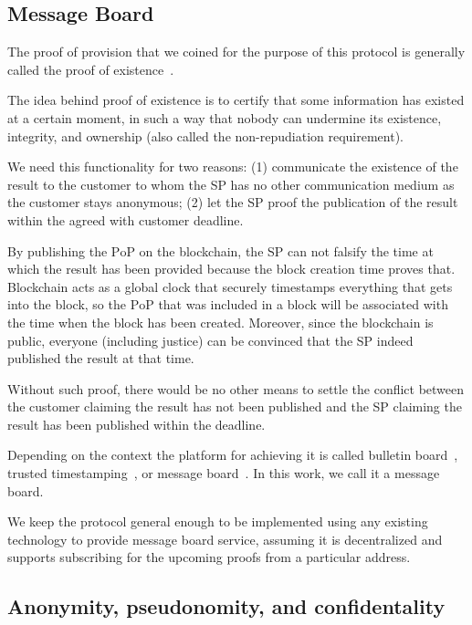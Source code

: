 \subsection{Message Board}\label{sec:message-board}
The proof of provision that we coined for the purpose of this protocol is generally called the proof of existence~\cite{crespoStamperyBlockchainTimestamping2017}.

The idea behind proof of existence is to certify that some information
has existed at a certain moment, in such a way that nobody can
undermine its existence, integrity, and ownership (also called the
non-repudiation requirement).


We need this functionality for two reasons: (1) communicate the existence of the result to the customer to whom the SP has no other communication medium as the customer stays anonymous; (2) let the SP proof the publication of the result within the agreed with customer deadline. 

By publishing the $\mathrm{PoP}$ on the blockchain, the SP can not falsify the time at which the result has been provided because the block creation time proves that. Blockchain acts as a global clock that securely timestamps everything that gets into the block, so the $\mathrm{PoP}$ that was included in a block will be associated with the time when the block has been created. Moreover, since the blockchain is public, everyone (including justice) can be convinced that the SP indeed published the result at that time.

Without such proof, there would be no other means to settle the conflict between the customer claiming the result has not been published and the SP claiming the result has been published within the deadline.

Depending on the context the platform for achieving it is called bulletin board~\cite{achenbachImprovedCoercionresistantElectronic2015}, trusted timestamping~\cite{gippDecentralizedTrustedTimestamping2015}, or message board~\cite{hinarejosSolutionSecureCertified2019}. In this work, we call it a message board.

We keep the protocol general enough to be implemented using any existing technology to provide message board service, assuming it is decentralized and supports subscribing for the upcoming proofs from a particular address.

\subsection{Anonymity, pseudonomity, and confidentality}\label{sec:pseudo-anon}

